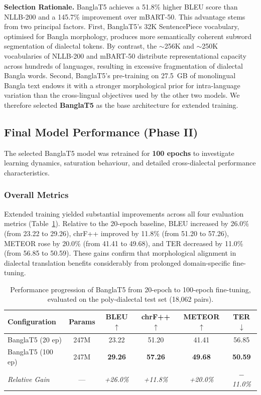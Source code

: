 \documentclass[12pt,a4paper]{article}
\begin{document}
\textbf{Selection Rationale.} BanglaT5 achieves a 51.8\% higher BLEU score than NLLB-200 and a 145.7\% improvement over mBART-50. This advantage stems from two principal factors. First, BanglaT5's 32K SentencePiece vocabulary, optimised for Bangla morphology, produces more semantically coherent subword segmentation of dialectal tokens. By contrast, the $\sim$256K and $\sim$250K vocabularies of NLLB-200 and mBART-50 distribute representational capacity across hundreds of languages, resulting in excessive fragmentation of dialectal Bangla words. Second, BanglaT5's pre-training on 27.5~GB of monolingual Bangla text endows it with a stronger morphological prior for intra-language variation than the cross-lingual objectives used by the other two models. We therefore selected \textbf{BanglaT5} as the base architecture for extended training.

\subsection{Final Model Performance (Phase II)}
The selected BanglaT5 model was retrained for \textbf{100 epochs} to investigate learning dynamics, saturation behaviour, and detailed cross-dialectal performance characteristics.

\subsubsection{Overall Metrics}
Extended training yielded substantial improvements across all four evaluation metrics (Table~\ref{tab:model_results_final}). Relative to the 20-epoch baseline, BLEU increased by 26.0\% (from 23.22 to 29.26), chrF++ improved by 11.8\% (from 51.20 to 57.26), METEOR rose by 20.0\% (from 41.41 to 49.68), and TER decreased by 11.0\% (from 56.85 to 50.59). These gains confirm that morphological alignment in dialectal translation benefits considerably from prolonged domain-specific fine-tuning.

\begin{table}[htbp]
\centering
\small
\caption{Performance progression of BanglaT5 from 20-epoch to 100-epoch fine-tuning, evaluated on the poly-dialectal test set (18,062 pairs).}
\label{tab:model_results_final}
\begin{tabular}{l c c c c c}
\toprule
\textbf{Configuration} & \textbf{Params} & \textbf{BLEU $\uparrow$} & \textbf{chrF++ $\uparrow$} & \textbf{METEOR $\uparrow$} & \textbf{TER $\downarrow$} \\
\midrule
BanglaT5 (20 ep) & 247M & 23.22 & 51.20 & 41.41 & 56.85 \\
BanglaT5 (100 ep) & 247M & \textbf{29.26} & \textbf{57.26} & \textbf{49.68} & \textbf{50.59} \\
\midrule
\textit{Relative Gain} & --- & \textit{+26.0\%} & \textit{+11.8\%} & \textit{+20.0\%} & \textit{$-$11.0\%} \\
\bottomrule
\end{tabular}
\end{table}
\end{document}
